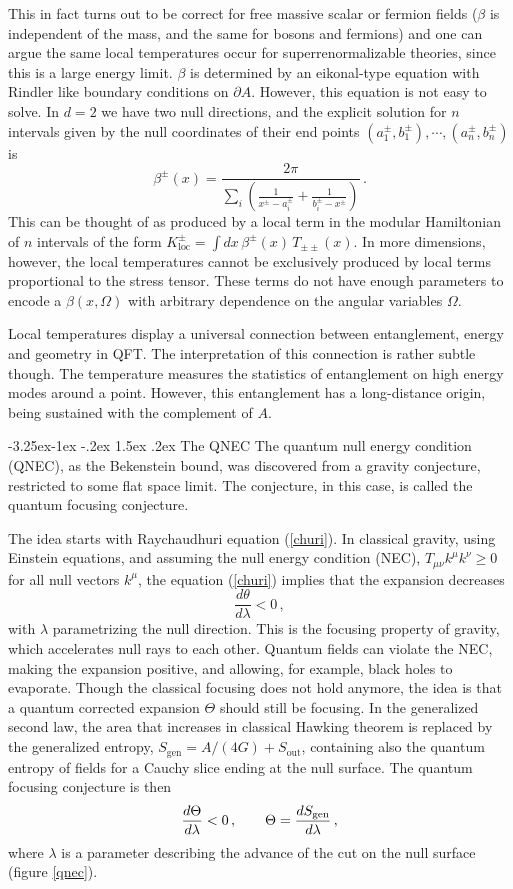 \documentclass[11pt,a4paper]{article}
\makeatletter
\renewcommand\subsection{\@startsection{subsection}{2}{\z@}%
                                   {-3.25ex\@plus -1ex \@minus -.2ex}%
                                     {1.5ex \@plus .2ex}%
                                     {\normalfont\bfseries}}
\numberwithin{equation}{section}
\newcommand{\be}{\begin{equation}}
\newcommand{\ee}{\end{equation}}
\makeatother
\begin{document}
This in fact turns out to be correct for free massive scalar or fermion fields  ($\beta$ is independent of the mass, and the same for bosons and fermions) and one can argue the same local temperatures occur for superrenormalizable theories, since this is a large energy limit. $\beta$ is determined by an eikonal-type equation with Rindler like boundary conditions on $\partial A$. However, this equation is not easy to solve. In $d=2$ we have two null directions, and the explicit solution for $n$ intervals given by the null coordinates of their end points $(a_1^\pm,b_1^\pm),\cdots, (a_n^\pm,b_n^\pm)$ is
\be
\beta^\pm(x)=\frac{2\pi}{\sum_i \left(\frac{1}{x^\pm-a_i^\pm}+\frac{1}{b_i^\pm-x^\pm}\right)}\,.  
\ee
This can be thought of as produced by a local term in the modular Hamiltonian of $n$ intervals of the form $K^\pm_{\textrm{loc}}= \int dx\, \beta^\pm(x)\, T_{\pm\pm}(x)$. In more dimensions, however, the local temperatures cannot be exclusively produced by local terms proportional to the stress tensor. These terms do not have enough parameters to encode a $\beta(x,\Omega)$ with arbitrary dependence on the angular variables $\Omega$. 

Local temperatures display a universal connection between entanglement, energy and geometry in QFT. The interpretation of this connection is rather subtle though. The temperature measures the statistics of entanglement on high energy modes around a point. However, this entanglement has a long-distance origin, being sustained with the complement of $A$.     

\subsection{The QNEC}
The quantum null energy condition (QNEC), as the Bekenstein bound, was discovered from a gravity conjecture, restricted to some flat space limit. The conjecture, in this case, is called the quantum focusing conjecture. 

The idea starts with Raychaudhuri equation (\ref{churi}). In classical gravity, using Einstein equations, and assuming the null energy condition (NEC), $T_{\mu\nu}k^\mu k^\nu\ge 0$ for all null vectors $k^\mu$, the equation (\ref{churi}) implies that the expansion decreases
\be
\frac{d\theta}{d\lambda}<0\,,
\ee
with $\lambda$ parametrizing the null direction. 
 This is the focusing property of gravity, which accelerates null rays to each other. Quantum fields can violate the NEC, making the expansion positive, and allowing, for example, black holes to evaporate. Though the classical focusing does not hold anymore, the idea is that a quantum corrected expansion $\Theta$ should still be focusing. In the generalized second law, the area that increases in classical Hawking theorem is replaced by the generalized entropy, $S_{\textrm{gen}}=A/(4G)+S_{\textrm{out}}$, containing also the quantum entropy of fields for a Cauchy slice ending at the null surface. The quantum focusing conjecture is then
 \be
 \frac{d\Theta}{d\lambda}<0\,,\hspace{.7cm} \Theta= \frac{dS_{\textrm{gen}}}{d\lambda}\,,   
\ee
where $\lambda$ is a parameter describing the advance of the cut on the null surface (figure \ref{qnec}). 
\end{document}
